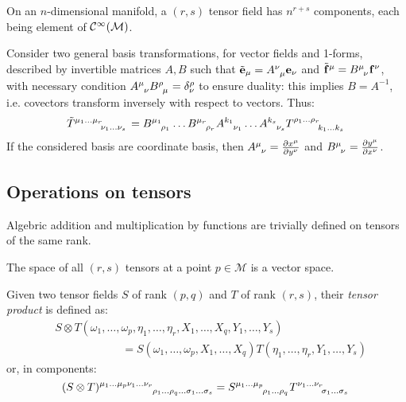 \begin{proposition}
  On an $ n $-dimensional manifold, a $ (r,s) $ tensor field has $ n^{r+s} $ components, each being element of $ \mathcal{C}^{\infty}(\mathcal{M}) $.
\end{proposition}

Consider two general basis transformations, for vector fields and 1-forms, described by invertible matrices $ A,B $ such that $ \tilde{\ve{e}}_{\mu} = \tensor{A}{^\nu_\mu}\ve{e}_{\nu} $ and $ \tilde{\ve{f}}^{\mu} = \tensor{B}{^\mu_\nu}\ve{f}^{\nu} $, with necessary condition $ \tensor{A}{^\mu_\nu} \tensor{B}{^\rho_\mu} = \delta^{\rho}_{\nu} $ to ensure duality: this implies $ B = A^{-1} $, i.e. covectors transform inversely with respect to vectors. Thus:
\begin{equation}
  \tensor{\tilde{T}}{^{\mu_1}^{\dots}^{\mu_r}_{\nu_1}_{\dots}_{\nu_s}} = \tensor{B}{^{\mu_1}_{\rho_1}} \dots \tensor{B}{^{\mu_r}_{\rho_r}} \tensor{A}{^{k_1}_{\nu_1}} \dots \tensor{A}{^{k_s}_{\nu_s}} \tensor{T}{^{\rho_1}^{\dots}^{\rho_r}_{k_1}_{\dots}_{k_s}}
  \label{eq:2.26}
\end{equation}
If the considered basis are coordinate basis, then $ \tensor{A}{^\mu_\nu} = \frac{\pa x^{\mu}}{\pa y^{\nu}} $ and $ \tensor{B}{^\mu_\nu} = \frac{\pa y^{\mu}}{\pa x^{\nu}} $.

\subsection{Operations on tensors}

Algebric addition and multiplication by functions are trivially defined on tensors of the same rank.

\begin{proposition}
  The space of all $ (r,s) $ tensors at a point $ p \in \mathcal{M} $ is a vector space.
\end{proposition}

\begin{definition}
  Given two tensor fields $ S $ of rank $ (p,q) $ and $ T $ of rank $ (r,s) $, their \textit{tensor product} is defined as:
  \begin{equation}
    \begin{split}
      &S \otimes T (\omega_1,\dots,\omega_p,\eta_1,\dots,\eta_r,X_1,\dots,X_q,Y_1,\dots,Y_s)\\
      &\qquad\qquad\qquad = S(\omega_1,\dots,\omega_p,X_1,\dots,X_q) T(\eta_1,\dots,\eta_r,Y_1,\dots,Y_s)
    \end{split}
    \label{eq:2.27}
  \end{equation}
  or, in components:
  \begin{equation}
    \tensor{(S \otimes T)}{^{\mu_1}^{\dots}^{\mu_p}^{\nu_1}^{\dots}^{\nu_r}_{\rho_1}_{\dots}_{\rho_q}_{\dots}_{\sigma_1}_{\dots}_{\sigma_s}} = \tensor{S}{^{\mu_1}^{\dots}^{\mu_p}_{\rho_1}_{\dots}_{\rho_q}} \tensor{T}{^{\nu_1}^{\dots}^{\nu_r}_{\sigma_1}_{\dots}_{\sigma_s}}
    \label{eq:2.28}
  \end{equation}
\end{definition}


